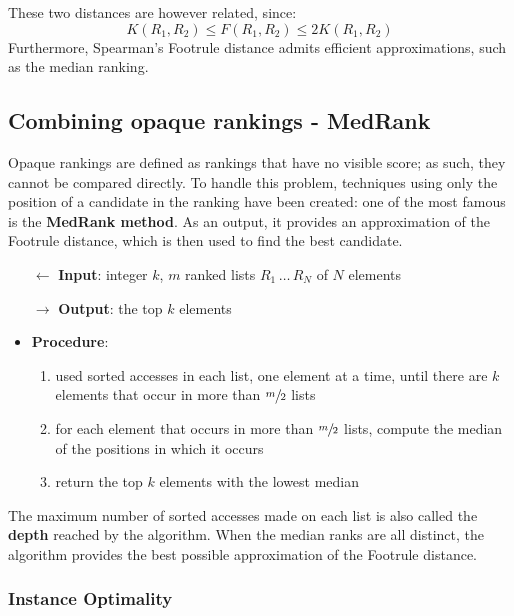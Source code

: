 \documentclass[english]{article}
\begin{document}
These two distances are however related, since:
\[ K(R_1, R_2) \leq F(R_1, R_2) \leq 2 K(R_1, R_2) \]
Furthermore, Spearman's Footrule distance admits efficient approximations, such as the median ranking.

\subsection{Combining opaque rankings - MedRank}

Opaque rankings are defined as rankings that have no visible score;
as such, they cannot be compared directly.
To handle this problem, techniques using only the position of a candidate in the ranking have been created: one of the most famous is the \textbf{MedRank method}.
As an output, it provides an approximation of the Footrule distance, which is then used to find the best candidate.

\begin{itemize}
  \item[\(\leftarrow\)] \textbf{Input}: integer \(k\), \(m\) ranked lists \(R_1 \,\ldots \, R_N\) of \(N\) elements
  \item[\(\rightarrow\)] \textbf{Output}: the top \(k\) elements
  \item \textbf{Procedure}:
        \begin{enumerate}[label=step \arabic*., ref=step (\arabic*), widest*=7, leftmargin=*, labelindent=1em]
          \item used sorted accesses in each list, one element at a time, until there are \(k\) elements that occur in more than \(\sfrac{m}{2}\) lists
          \item for each element that occurs in more than \(\sfrac{m}{2}\) lists, compute the median of the positions in which it occurs
          \item return the top \(k\) elements with the lowest median
        \end{enumerate}
\end{itemize}

The maximum number of sorted accesses made on each list is also called the \textbf{depth} reached by the algorithm.
When the median ranks are all distinct, the algorithm provides the best possible approximation of the Footrule distance.

\subsubsection{Instance Optimality}
\end{document}
